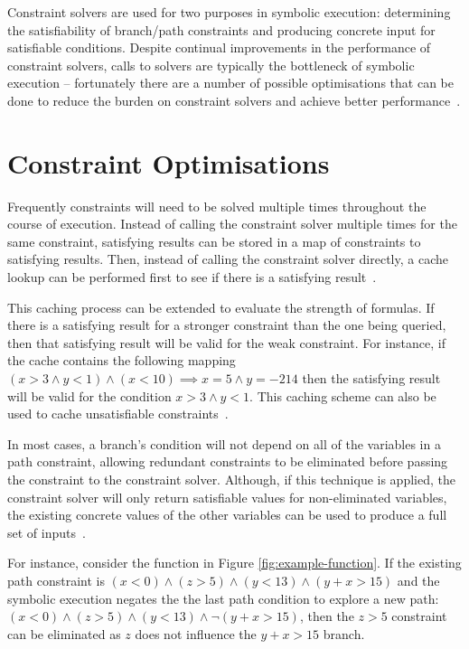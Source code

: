 \documentclass[]{final_report}
\begin{document}
Constraint solvers are used for two purposes in symbolic execution: determining the satisfiability of branch/path constraints and producing concrete input for satisfiable conditions. Despite continual improvements in the performance of constraint solvers, calls to solvers are typically the bottleneck of symbolic execution -- fortunately there are a number of possible optimisations that can be done to reduce the burden on constraint solvers and achieve better performance~\cite{cadar2013symbolic}.

\section{Constraint Optimisations}
Frequently constraints will need to be solved multiple times throughout the course of execution. Instead of calling the constraint solver multiple times for the same constraint, satisfying results can be stored in a map of constraints to satisfying results. Then, instead of calling the constraint solver directly, a cache lookup can be performed first to see if there is a satisfying result~\cite{cadar2008klee}.

This caching process can be extended to evaluate the strength of formulas. If there is a satisfying result for a stronger constraint than the one being queried, then that satisfying result will be valid for the weak constraint. For instance, if the cache contains the following mapping $ (x > 3 \land y <1) \land (x < 10) \implies x = 5 \land y = -214$ then the satisfying result will be valid for the condition $x > 3 \land y < 1 $. This caching scheme can also be used to cache unsatisfiable constraints~\cite{cadar2008klee}.

In most cases, a branch's condition will not depend on all of the variables in a path constraint, allowing redundant constraints to be eliminated before passing the constraint to the constraint solver. Although, if this technique is applied, the constraint solver will only return satisfiable values for non-eliminated variables, the existing concrete values of the other variables can be used to produce a full set of inputs~\cite{cadar2013symbolic}.

For instance, consider the function in Figure \ref{fig:example-function}. If the existing path constraint is $(x < 0 ) \land ( z > 5) \land (y < 13) \land (y + x > 15)$ and the symbolic execution negates the the last path condition to explore a new path: $ (x < 0) \land (z > 5) \land (y < 13) \land \lnot(y + x > 15)$, then the $z > 5$ constraint can be eliminated as $z$ does not influence the $y + x > 15$ branch.
\end{document}
